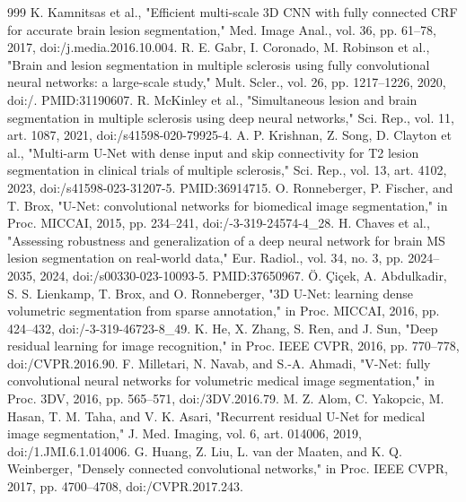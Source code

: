 \documentclass[journal,twoside,web]{ieeecolor}
\begin{document}
\begin{thebibliography}{999}
 K. Kamnitsas et al., "Efficient multi-scale 3D CNN with fully connected CRF for accurate brain lesion segmentation," Med. Image Anal., vol. 36, pp. 61--78, 2017, doi:/\allowbreak j.media.2016.10.004.
 R. E. Gabr, I. Coronado, M. Robinson et al., "Brain and lesion segmentation in multiple sclerosis using fully convolutional neural networks: a large-scale study," Mult. Scler., vol. 26, pp. 1217--1226, 2020, doi:/. PMID:31190607.
 R. McKinley et al., "Simultaneous lesion and brain segmentation in multiple sclerosis using deep neural networks," Sci. Rep., vol. 11, art. 1087, 2021, doi:/\allowbreak s41598-020-79925-4.
 A. P. Krishnan, Z. Song, D. Clayton et al., "Multi-arm U-Net with dense input and skip connectivity for T2 lesion segmentation in clinical trials of multiple sclerosis," Sci. Rep., vol. 13, art. 4102, 2023, doi:/\allowbreak s41598-023-31207-5. PMID:36914715.
 O. Ronneberger, P. Fischer, and T. Brox, "U-Net: convolutional networks for biomedical image segmentation," in Proc. MICCAI, 2015, pp. 234--241, doi:/-3-319-24574-4\_28.
 H. Chaves et al., "Assessing robustness and generalization of a deep neural network for brain MS lesion segmentation on real-world data," Eur. Radiol., vol. 34, no. 3, pp. 2024--2035, 2024, doi:/\allowbreak s00330-023-10093-5. PMID:37650967.
 Ö. Çiçek, A. Abdulkadir, S. S. Lienkamp, T. Brox, and O. Ronneberger, "3D U-Net: learning dense volumetric segmentation from sparse annotation," in Proc. MICCAI, 2016, pp. 424--432, doi:/-3-319-46723-8\_49.
 K. He, X. Zhang, S. Ren, and J. Sun, "Deep residual learning for image recognition," in Proc. IEEE CVPR, 2016, pp. 770--778, doi:/\allowbreak CVPR.2016.90.
 F. Milletari, N. Navab, and S.-A. Ahmadi, "V-Net: fully convolutional neural networks for volumetric medical image segmentation," in Proc. 3DV, 2016, pp. 565--571, doi:/\allowbreak 3DV.2016.79.
 M. Z. Alom, C. Yakopcic, M. Hasan, T. M. Taha, and V. K. Asari, "Recurrent residual U-Net for medical image segmentation," J. Med. Imaging, vol. 6, art. 014006, 2019, doi:/\allowbreak 1.JMI.6.1.014006.
 G. Huang, Z. Liu, L. van der Maaten, and K. Q. Weinberger, "Densely connected convolutional networks," in Proc. IEEE CVPR, 2017, pp. 4700--4708, doi:/\allowbreak CVPR.2017.243.

\end{thebibliography}
\end{document}
